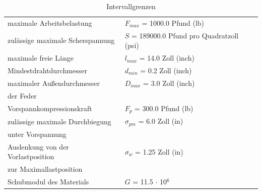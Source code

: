 \documentclass[fontsize=12, a4aper]{scrartcl}
\begin{document}
	\begin{table}[H]
		
		\fontsize{10pt}{12pt}
		
		\caption{Intervallgrenzen}
		
		\label{table:int_restrict}
		
		\begin{center}
			
			\begin{tabular}{l l}
				
				\hline
				
				maximale Arbeitsbelastung & \(F_{max}\) = 1000.0 Pfund (lb)\\
				
				zulässige maximale Scherspannung & \(S\) = 189000.0 Pfund pro Quadratzoll (psi)\\
				
				maximale freie Länge & \(l_{max}\) = 14.0 Zoll (inch)\\
				
				Mindestdrahtdurchmesser & \(d_{min}\) = 0.2 Zoll (inch)\\
				
				maximaler Außendurchmesser & \(D_{max}\) = 3.0 Zoll (inch)\\
				
				der Feder & \\
				
				Vorspannkompressionskraft & \(F_p\) = 300.0 Pfund (lb)\\
				
				zulässige maximale Durchbiegung & \(\sigma_{pm}\) = 6.0 Zoll (in)\\
				
				unter Vorspannung & \\
				
				Auslenkung von der Vorlastposition & \(\sigma_{w}\) = 1.25 Zoll (in)\\
				
				zur Maximallastposition & \\
				
				Schubmodul des Materials & \(G\) = 11.5 \(\cdot\) 10\(^6\)\\
				
				\hline
				
			\end{tabular}
			
		\end{center}
		
	\end{table}
	
\end{document}
